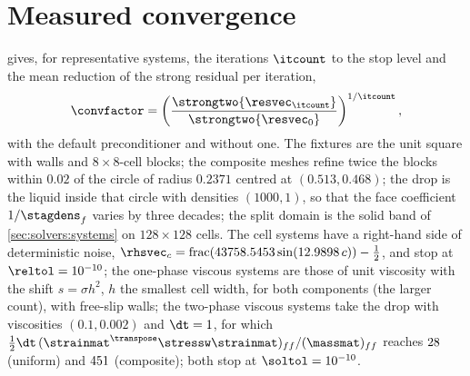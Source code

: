 \section{Measured convergence}\label{sec:solvers:measured}
 gives, for representative systems, the iterations
$\itcount$ to the stop level and the mean reduction of the strong residual per
iteration,
\begin{equation}\label{eq:solvers:factor}
  \convfactor=\roundpar{\frac{\strongtwo{\resvec_{\itcount}}}{\strongtwo{\resvec_0}}}^{1/\itcount},
\end{equation}
with the default preconditioner and without one. The fixtures are the unit
square with walls and $8\times8$-cell blocks; the composite meshes refine
twice the blocks within $0.02$ of the circle of radius $0.2371$ centred at
$(0.513,0.468)$; the drop is the liquid inside that circle with densities
$(1000,1)$, so that the face coefficient $1/\stagdens_f$ varies by three
decades; the split domain is the solid band of \cref{sec:solvers:systems} on
$128\times128$ cells. The cell systems have a right-hand side of
deterministic noise, $\rhsvec_c=\operatorname{frac}(43758.5453\sin(12.9898\,c))-\tfrac12$,
and stop at $\reltol=10^{-10}$; the one-phase viscous systems are those of
unit viscosity with the shift $s=\sigma h^2$, $h$ the smallest cell width,
for both components (the larger count), with free-slip walls; the two-phase
viscous systems take the drop with viscosities $(0.1,0.002)$ and $\dt=1$, for
which $\tfrac12\dt\,(\strainmat^{\transpose}\stressw\strainmat)_{ff}/(\massmat)_{ff}$
reaches $28$ (uniform) and $451$
(composite); both stop at $\soltol=10^{-10}$.

